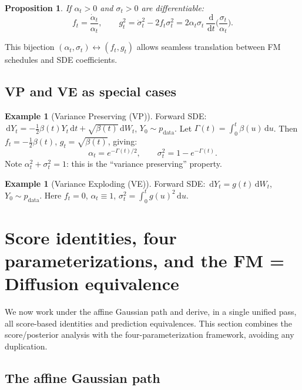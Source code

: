 \documentclass[11pt]{article}
\newcommand{\dd}{\,\mathrm{d}}
\newtheorem{proposition}[theorem]{Proposition}
\theoremstyle{definition}
\newtheorem{example}[theorem]{Example}
\theoremstyle{remark}
\begin{document}
\begin{proposition}\label{prop:inverse-id}
If $\alpha_t > 0$ and $\sigma_t > 0$ are differentiable:
\begin{equation}\label{eq:f-from-alpha}
f_t = \frac{\dot\alpha_t}{\alpha_t}, \qquad g_t^2 = \dot\sigma_t^2 - 2f_t\sigma_t^2 = 2\alpha_t\sigma_t\,\frac{\dd}{\dd t}\!\Big(\frac{\sigma_t}{\alpha_t}\Big).
\end{equation}
\end{proposition}

This bijection $(\alpha_t,\sigma_t)\leftrightarrow(f_t,g_t)$ allows seamless translation between FM schedules and SDE coefficients.

\subsection{VP and VE as special cases}

\begin{example}[Variance Preserving (VP)]
Forward SDE: $\dd Y_t = -\frac{1}{2}\beta(t)Y_t\dd t + \sqrt{\beta(t)}\dd W_t$, $Y_0\sim p_{\mathrm{data}}$.
Let $\Gamma(t) = \int_0^t\beta(u)\dd u$. Then $f_t = -\frac{1}{2}\beta(t)$, $g_t = \sqrt{\beta(t)}$, giving:
\[
\alpha_t = e^{-\Gamma(t)/2}, \qquad \sigma_t^2 = 1 - e^{-\Gamma(t)}.
\]
Note $\alpha_t^2 + \sigma_t^2 = 1$: this is the ``variance preserving'' property.
\end{example}

\begin{example}[Variance Exploding (VE)]
Forward SDE: $\dd Y_t = g(t)\dd W_t$, $Y_0\sim p_{\mathrm{data}}$.
Here $f_t = 0$, $\alpha_t \equiv 1$, $\sigma_t^2 = \int_0^t g(u)^2\dd u$.
\end{example}

\section{Score identities, four parameterizations, and the FM = Diffusion equivalence}\label{sec:four-param}

We now work under the affine Gaussian path and derive, in a single unified pass, all score-based identities and prediction equivalences.
This section combines the score/posterior analysis with the four-parameterization framework, avoiding any duplication.

\subsection{The affine Gaussian path}\label{subsec:affine-setup}
\end{document}
